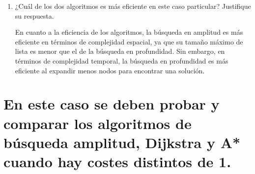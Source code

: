 \documentclass[12pt,a4paper,spanish]{book}
\numberwithin{equation}{chapter}
\numberwithin{figure}{chapter}
\begin{document}
\begin{enumerate}
	Profundidad no obtiene un resultado óptimo, su coste de solución es de 15. Esto se debe a que exploró la primera columna completamente por lo que no va encontrar el camino que llega a la solución yendo a la derecha en lugar de bajar. 
        
	\item ¿Cuál de los dos algoritmos es más eficiente en este caso particular? Justifique su respuesta.
	
    En cuanto a la eficiencia de los algoritmos, la búsqueda en amplitud es más eficiente en términos de complejidad espacial, ya que su tamaño máximo de lista es menor que el de la búsqueda en profundidad. Sin embargo, en términos de complejidad temporal, la búsqueda en profundidad es más eficiente al expandir menos nodos para encontrar una solución. 
\end{enumerate}

\section{En este caso se deben probar y comparar los algoritmos de búsqueda amplitud, Dijkstra y A* cuando hay costes distintos de 1.}
\end{document}
